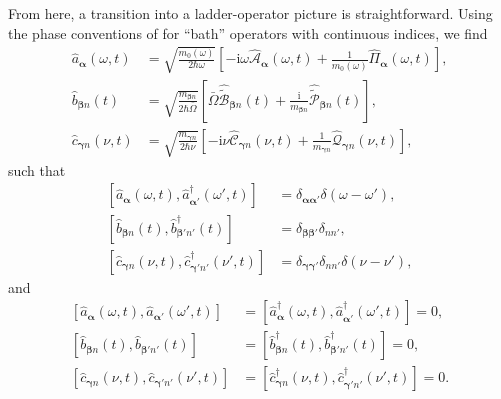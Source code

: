 \documentclass{article}
\begin{document}
From here, a transition into a ladder-operator picture is straightforward. Using the phase conventions of \citet{huttner1992quantization} for ``bath'' operators with continuous indices, we find
\begin{equation}
\begin{split}
\hat{a}_{\bm{\alpha}}(\omega,t) &= \sqrt{\frac{m_0(\omega)}{2\hbar\omega}}\left[-\mathrm{i}\omega\hat{\mathcal{A}}_{\bm{\alpha}}(\omega,t) + \frac{1}{m_0(\omega)}\hat{\mathit{\Pi}}_{\bm{\alpha}}(\omega,t)\right],\\
\hat{b}_{\bm{\beta}n}(t) &= \sqrt{\frac{m_{\bm{\beta}n}}{2\hbar\bar{\Omega}}}\left[\bar{\Omega}\hat{\tilde{\mathcal{B}}}_{\bm{\beta}n}(t) + \frac{\mathrm{i}}{m_{\bm{\beta}n}}\hat{\tilde{\mathcal{P}}}_{\bm{\beta}n}(t)\right],\\
\hat{c}_{\bm{\gamma}n}(\nu,t) &= \sqrt{\frac{m_{\bm{\gamma}n}}{2\hbar\nu}}\left[-\mathrm{i}\nu\hat{\mathcal{C}}_{\bm{\gamma}n}(\nu,t) + \frac{1}{m_{\bm{\gamma}n}}\hat{\mathcal{Q}}_{\bm{\gamma}n}(\nu,t)\right],
\end{split}
\end{equation}
such that
\begin{equation}
\begin{split}
\left[\hat{a}_{\bm{\alpha}}(\omega,t),\hat{a}_{\bm{\alpha}'}^\dagger(\omega',t)\right] &= \delta_{\bm{\alpha}\bm{\alpha}'}\delta(\omega - \omega'),\\
\left[\hat{b}_{\bm{\beta}n}(t),\hat{b}_{\bm{\beta}'n'}^\dagger(t)\right] &= \delta_{\bm{\beta}\bm{\beta}'}\delta_{nn'},\\
\left[\hat{c}_{\bm{\gamma}n}(\nu,t),\hat{c}_{\bm{\gamma}'n'}^\dagger(\nu',t)\right] &= \delta_{\bm{\gamma}\bm{\gamma}'}\delta_{nn'}\delta(\nu - \nu'),
\end{split}
\end{equation}
and
\begin{equation}
\begin{split}
\left[\hat{a}_{\bm{\alpha}}(\omega,t),\hat{a}_{\bm{\alpha}'}(\omega',t)\right] &= \left[\hat{a}_{\bm{\alpha}}^\dagger(\omega,t),\hat{a}_{\bm{\alpha}'}^\dagger(\omega',t)\right] = 0,\\
\left[\hat{b}_{\bm{\beta}n}(t),\hat{b}_{\bm{\beta}'n'}(t)\right] &= \left[\hat{b}_{\bm{\beta}n}^\dagger(t),\hat{b}_{\bm{\beta}'n'}^\dagger(t)\right] = 0,\\
\left[\hat{c}_{\bm{\gamma}n}(\nu,t),\hat{c}_{\bm{\gamma}'n'}(\nu',t)\right] &= \left[\hat{c}_{\bm{\gamma}n}^\dagger(\nu,t),\hat{c}_{\bm{\gamma}'n'}^\dagger(\nu',t)\right] = 0.
\end{split}
\end{equation}
\end{document}

